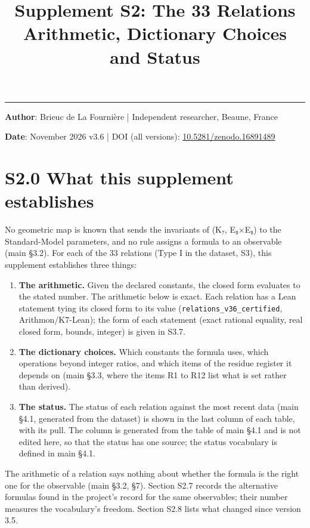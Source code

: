 \documentclass[11pt,a4paper]{article}
\title{%
\LARGE\textbf{Supplement S2: The 33 Relations}\\[0.3em]
\large Arithmetic, Dictionary Choices and Status%
}
\author{}
\date{}
\begin{document}
\maketitle
\noindent\rule{\textwidth}{0.2pt}

\noindent\textbf{Author}: Brieuc de La Fourni\`ere \quad | \quad Independent researcher, Beaune, France

\noindent\textbf{Date}: November 2026 \quad v3.6 \quad | \quad DOI (all versions): \href{https://doi.org/10.5281/zenodo.16891489}{10.5281/zenodo.16891489}

\thispagestyle{fancy}

\section{S2.0 What this supplement establishes}\label{s2.0-what-this-supplement-establishes}

No geometric map is known that sends the invariants of (K₇, E₈×E₈) to the Standard-Model parameters, and no rule assigns a formula to an observable (main §3.2). For each of the 33 relations (Type I in the dataset, S3), this supplement establishes three things:

\begin{enumerate}
\def\labelenumi{\arabic{enumi}.}
\tightlist
\item
  \textbf{The arithmetic.} Given the declared constants, the closed form evaluates to the stated number. The arithmetic below is exact. Each relation has a Lean statement tying its closed form to its value (\texttt{relations\_\allowbreak{}v36\_\allowbreak{}certified}, Arithmon/K7-Lean); the form of each statement (exact rational equality, real closed form, bounds, integer) is given in S3.7.
\item
  \textbf{The dictionary choices.} Which constants the formula uses, which operations beyond integer ratios, and which items of the residue register it depends on (main §3.3, where the items R1 to R12 list what is set rather than derived).
\item
  \textbf{The status.} The status of each relation against the most recent data (main §4.1, generated from the dataset) is shown in the last column of each table, with its pull. The column is generated from the table of main §4.1 and is not edited here, so that the status has one source; the status vocabulary is defined in main §4.1.
\end{enumerate}

The arithmetic of a relation says nothing about whether the formula is the right one for the observable (main §3.2, §7). Section S2.7 records the alternative formulas found in the project's record for the same observables; their number measures the vocabulary's freedom. Section S2.8 lists what changed since version 3.5.
\end{document}
